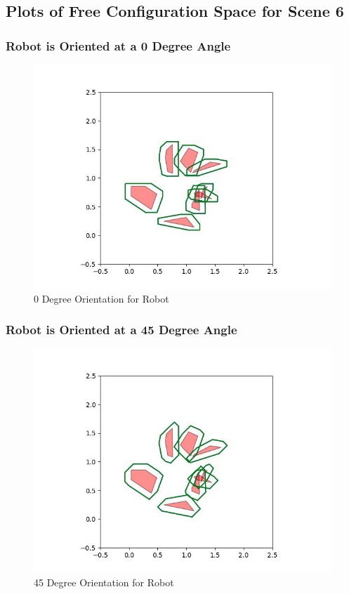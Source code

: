 \documentclass{article}
\begin{document}
\newpage
\subsection{Plots of Free Configuration Space for Scene 6}
\subsubsection{Robot is Oriented at a 0 Degree Angle}
\begin{figure}[h!]
	\includegraphics[width= 0.9 \linewidth]{Problem3_minkowski6_0.jpg}
	\centering
	\caption{0 Degree Orientation for Robot}
	\label{Problem3_minkowski6_0.jpg}
\end{figure}

\newpage
\subsubsection{Robot is Oriented at a 45 Degree Angle}
\begin{figure}[h!]
	\includegraphics[width= 0.9 \linewidth]{Problem3_minkowski6_45.jpg}
	\centering
	\caption{45 Degree Orientation for Robot}
	\label{Problem3_minkowski6_45.jpg}
\end{figure}
\end{document}
